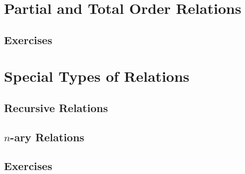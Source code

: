 \section{Partial and Total Order Relations}



\subsection{Exercises}
\section{Special Types of Relations}
\subsection{Recursive Relations}
\subsection{\(n\)-ary Relations}

\subsection{Exercises}



